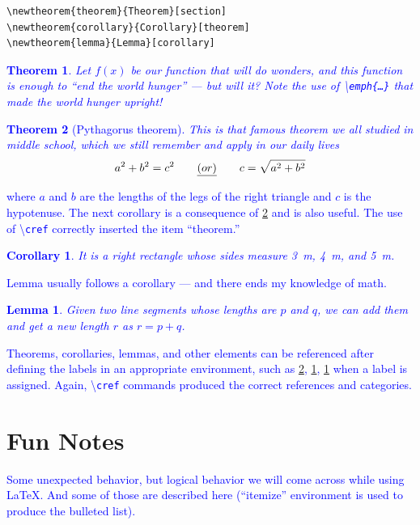 \documentclass[phd,showframe]{ndsu-thesis-2022}
\newtheorem{theorem}{Theorem}[section]
\newtheorem{corollary}{Corollary}[theorem]
\newtheorem{lemma}{Lemma}[corollary]
\newcommand\italk[1]{\textcolor{blue}{#1}}  %
\newcommand\cmd[1]{\textbackslash\texttt{#1}}  %
\begin{document}
\begin{verbatim}
\newtheorem{theorem}{Theorem}[section]
\newtheorem{corollary}{Corollary}[theorem]
\newtheorem{lemma}{Lemma}[corollary]
\end{verbatim}

\vspace{-0.5in}
\italk{
\begin{theorem}
Let \(f(x)\) be our function that will do wonders, and this function is enough to \emph{``end the world hunger''} --- but will it? Note the use of \cmd{emph\{\ldots\}} that made the world hunger upright!
\end{theorem}
\begin{theorem}[Pythagorus theorem]
\label{pytha}
This is that famous theorem we all studied in middle school, which we still remember and apply in our daily lives 
\vspace{6ex} 
\[ a^2 + b^2 = c^2  \qquad \emph{(or)} \qquad c = \sqrt{a^2 + b^2} \] 
\end{theorem}
\vspace{-3ex} 
\noindent where $a$ and $b$ are the lengths of the legs of the right triangle and $c$ is the hypotenuse. 
The next corollary is a consequence of \cref{pytha} and is also useful. The use of \cmd{cref} correctly inserted the item ``theorem.''
\begin{corollary}
It is a right rectangle whose sides measure \qty{3}{m}, \qty{4}{m}, and \qty{5}{m}.
\label{coro}
\end{corollary}
Lemma usually follows a corollary --- and there ends my knowledge of math.
\begin{lemma}
Given two line segments whose lengths are $p$ and $q$, we can add them and get a new length $r$ as \(r=p+q\).
\label{lem}
\end{lemma}
Theorems, corollaries, lemmas, and other elements can be referenced after defining the labels in an appropriate environment, such as \cref{pytha}, \cref{coro}, \cref{lem} when a label is assigned. Again, \cmd{cref} commands produced the correct references and categories. 
}

\vt
\section{Fun Notes}
\italk{Some unexpected behavior, but logical behavior we will come across while using \LaTeX. And some of those are described here (``itemize'' environment is used to produce the bulleted list).}
\end{document}
